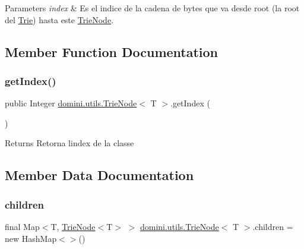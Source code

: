 \begin{DoxyParams}{Parameters}
{\em index} & Es el indice de la cadena de bytes que va desde root (la root del \hyperlink{classdomini_1_1utils_1_1Trie}{Trie}) hasta este \hyperlink{classdomini_1_1utils_1_1TrieNode}{Trie\+Node}. \\
\hline
\end{DoxyParams}


\subsection{Member Function Documentation}
\mbox{\label{classdomini_1_1utils_1_1TrieNode_ac8e79df6ce5e7b33c6d08a0fe0681916}} 
\subsubsection{\texorpdfstring{get\+Index()}{getIndex()}}
{\footnotesize\ttfamily public Integer \hyperlink{classdomini_1_1utils_1_1TrieNode}{domini.\+utils.\+Trie\+Node}$<$ T $>$.get\+Index (\begin{DoxyParamCaption}{ }\end{DoxyParamCaption})\hspace{0.3cm}{\ttfamily [inline]}}

\begin{DoxyReturn}{Returns}
Retorna l\textquotesingle{}index de la classe 
\end{DoxyReturn}


\subsection{Member Data Documentation}
\mbox{\label{classdomini_1_1utils_1_1TrieNode_ae64d9c12696f526eecb3ff15aa290640}} 
\subsubsection{\texorpdfstring{children}{children}}
{\footnotesize\ttfamily final Map$<$T, \hyperlink{classdomini_1_1utils_1_1TrieNode}{Trie\+Node}$<$T$>$ $>$ \hyperlink{classdomini_1_1utils_1_1TrieNode}{domini.\+utils.\+Trie\+Node}$<$ T $>$.children = new Hash\+Map$<$$>$()\hspace{0.3cm}{\ttfamily [private]}}


